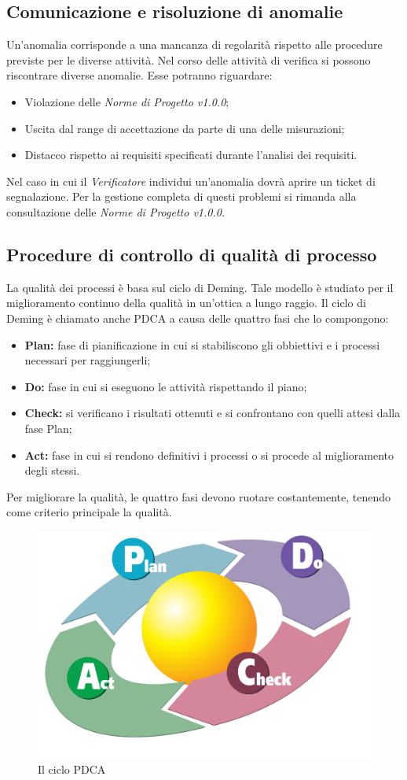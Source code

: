 \subsection{Comunicazione e risoluzione di anomalie}
Un'anomalia corrisponde a una mancanza di regolarità rispetto alle procedure previste per le diverse attività. Nel corso delle attività di verifica si possono riscontrare diverse anomalie. Esse potranno riguardare:
\begin{itemize}
	\item Violazione delle \textit{Norme di Progetto v1.0.0};
	\item Uscita dal range di accettazione da parte di una delle misurazioni;
	\item Distacco rispetto ai requisiti specificati durante l'analisi dei requisiti.
\end{itemize}
Nel caso in cui il \textit{Verificatore} individui un'anomalia dovrà aprire un ticket di segnalazione. Per la gestione completa di questi problemi si rimanda alla consultazione delle \textit{Norme di Progetto v1.0.0}.

\subsection{Procedure di controllo di qualità di processo}
La qualità dei processi è basa sul ciclo di Deming. Tale modello è studiato per il miglioramento continuo della qualità in un'ottica a lungo raggio.
Il ciclo di Deming è chiamato anche PDCA a causa delle quattro fasi che lo compongono:
\begin{itemize}
	\item \textbf{Plan:} fase di pianificazione in cui si stabiliscono gli obbiettivi e i processi necessari per raggiungerli;
	\item \textbf{Do:} fase in cui si eseguono le attività rispettando il piano;
	\item \textbf{Check:} si verificano i risultati ottenuti e si confrontano con quelli attesi dalla fase Plan;
	\item \textbf{Act:} fase in cui si rendono definitivi i processi o si procede al miglioramento degli stessi. 
\end{itemize}
Per migliorare la qualità, le quattro fasi devono ruotare costantemente, tenendo come criterio principale la qualità.
\begin{figure}[h]
\centering
\includegraphics[width=0.7\linewidth]{img/PDCA_Cycle}
\caption[Il ciclo PDCA]{Il ciclo PDCA}
\label{fig:PDCA_Cycle}
\end{figure}

